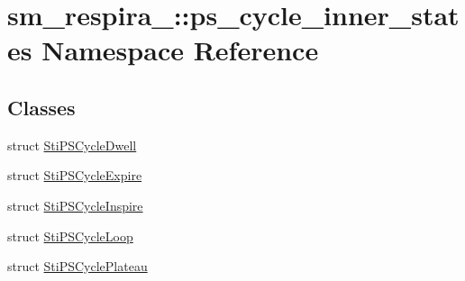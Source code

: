 \hypertarget{namespacesm__respira__1_1_1ps__cycle__inner__states}{}\section{sm\+\_\+respira\+\_\+:\+:ps\+\_\+cycle\+\_\+inner\+\_\+states Namespace Reference}
\label{namespacesm__respira__1_1_1ps__cycle__inner__states}
\subsection*{Classes}
\begin{DoxyCompactItemize}
\item 
struct \hyperlink{structsm__respira__1_1_1ps__cycle__inner__states_1_1StiPSCycleDwell}{Sti\+P\+S\+Cycle\+Dwell}
\item 
struct \hyperlink{structsm__respira__1_1_1ps__cycle__inner__states_1_1StiPSCycleExpire}{Sti\+P\+S\+Cycle\+Expire}
\item 
struct \hyperlink{structsm__respira__1_1_1ps__cycle__inner__states_1_1StiPSCycleInspire}{Sti\+P\+S\+Cycle\+Inspire}
\item 
struct \hyperlink{structsm__respira__1_1_1ps__cycle__inner__states_1_1StiPSCycleLoop}{Sti\+P\+S\+Cycle\+Loop}
\item 
struct \hyperlink{structsm__respira__1_1_1ps__cycle__inner__states_1_1StiPSCyclePlateau}{Sti\+P\+S\+Cycle\+Plateau}
\end{DoxyCompactItemize}
